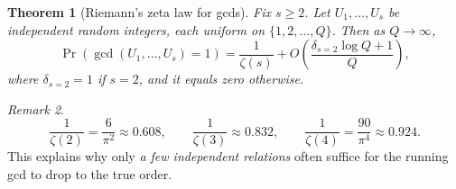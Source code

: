 \documentclass[11pt,reqno]{article}
\numberwithin{equation}{section}
\theoremstyle{plain}
\newtheorem{theorem}{Theorem}[section]
\theoremstyle{definition}
\theoremstyle{remark}
\newtheorem{remark}[theorem]{Remark}
\begin{document}
\begin{theorem}[Riemann's zeta law for gcds]\label{thm:zeta-gcd-clean}
Fix $s\ge 2$.  Let $U_1,\dots,U_s$ be independent random integers, each uniform on $\{1,2,\dots,Q\}$.
Then as $Q\to\infty$,
\[
\Pr(\gcd(U_1,\dots,U_s)=1)= \frac{1}{\zeta(s)}+O\left(\frac{\delta_{s=2} \log Q+1 }{Q}\right),
\]
where $\delta_{s=2}=1$ if $s=2$, and it equals zero otherwise.
\end{theorem}

\begin{remark}\label{rem:zeta-numerics-clean}
\[
\frac{1}{\zeta(2)}=\frac{6}{\pi^2}\approx 0.608,\qquad
\frac{1}{\zeta(3)}\approx 0.832,\qquad
\frac{1}{\zeta(4)}=\frac{90}{\pi^4}\approx 0.924.
\]
This explains why only \emph{ a few independent
relations} often suffice for the running gcd to drop to the true order.
\end{remark}
\end{document}
